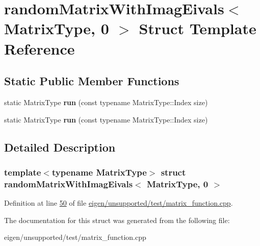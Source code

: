 \hypertarget{structrandom_matrix_with_imag_eivals_3_01_matrix_type_00_010_01_4}{}\section{random\+Matrix\+With\+Imag\+Eivals$<$ Matrix\+Type, 0 $>$ Struct Template Reference}
\label{structrandom_matrix_with_imag_eivals_3_01_matrix_type_00_010_01_4}
\subsection*{Static Public Member Functions}
\begin{DoxyCompactItemize}
\item 
\mbox{\label{structrandom_matrix_with_imag_eivals_3_01_matrix_type_00_010_01_4_a3af602883b56c58087d77d365cc28b90}} 
static Matrix\+Type {\bfseries run} (const typename Matrix\+Type\+::\+Index size)
\item 
\mbox{\label{structrandom_matrix_with_imag_eivals_3_01_matrix_type_00_010_01_4_a3af602883b56c58087d77d365cc28b90}} 
static Matrix\+Type {\bfseries run} (const typename Matrix\+Type\+::\+Index size)
\end{DoxyCompactItemize}


\subsection{Detailed Description}
\subsubsection*{template$<$typename Matrix\+Type$>$\newline
struct random\+Matrix\+With\+Imag\+Eivals$<$ Matrix\+Type, 0 $>$}



Definition at line \hyperlink{eigen_2unsupported_2test_2matrix__function_8cpp_source_l00050}{50} of file \hyperlink{eigen_2unsupported_2test_2matrix__function_8cpp_source}{eigen/unsupported/test/matrix\+\_\+function.\+cpp}.



The documentation for this struct was generated from the following file\+:\begin{DoxyCompactItemize}
\item 
eigen/unsupported/test/matrix\+\_\+function.\+cpp\end{DoxyCompactItemize}
